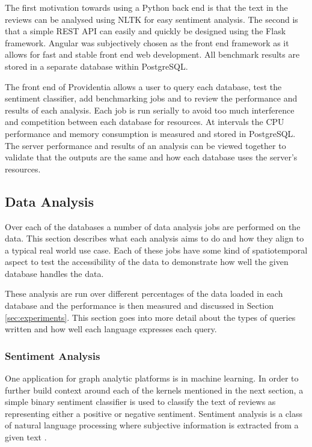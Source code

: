 The first motivation towards using a Python back end is that the text in the reviews can be 
analysed using NLTK for easy sentiment analysis. The second is that a simple REST API can 
easily and quickly be designed using the Flask framework. Angular was subjectively chosen 
as the front end framework as it allows for fast and stable front end web development. All 
benchmark results are stored in a separate database within PostgreSQL.

The front end of Providentia allows a user to query each database, test the sentiment classifier, 
add benchmarking jobs and to review the performance and results of each analysis. Each job is run 
serially to avoid too much interference and competition between each database for resources. At 
intervals the CPU performance and memory consumption is measured and stored in PostgreSQL. The 
server performance and results of an analysis can be viewed together to validate that the outputs 
are the same and how each database uses the server's resources.

\subsection{Data Analysis}
Over each of the databases a number of data analysis jobs are performed on the data. This section
describes what each analysis aims to do and how they align to a typical real world use case. Each
of these jobs have some kind of spatiotemporal aspect to test the accessibility of the data to 
demonstrate how well the given database handles the data. 

These analysis are run over different percentages of the data loaded in each database and the
performance is then measured and discussed in Section \ref{sec:experiments}. This section goes
into more detail about the types of queries written and how well each language expresses each 
query.

\subsubsection{Sentiment Analysis}
One application for graph analytic platforms is in machine learning. In order to further build 
context around each of the kernels mentioned in the next section, a simple binary sentiment 
classifier is used to classify the text of reviews as representing either a positive or negative 
sentiment. Sentiment analysis is a class of natural language processing where subjective 
information is extracted from a given text \cite{sentiment-analysis-gupta}.

